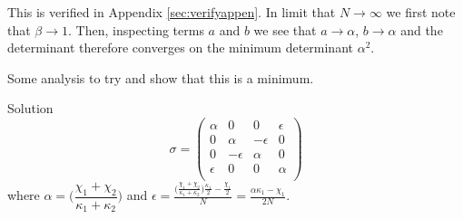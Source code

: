\documentclass[11pt,a4paper]{article}
\numberwithin{equation}{section}
\begin{document}
	This is verified in Appendix \ref{sec:verifyappen}. In limit that $N \rightarrow \infty$ we first note that $\beta \rightarrow 1$. Then, inspecting terms $a$ and $b$ we see that $a \rightarrow \alpha$, $b \rightarrow \alpha$ and the determinant therefore converges on the minimum determinant $\alpha^2$.
	
	Some analysis to try and show that this is a minimum.
	
	\iffalse

	Solution
	\begin{equation*}
	\sigma = \begin{pmatrix}
	\alpha & 0 & 0 & \epsilon\\
	0 & \alpha & -\epsilon & 0\\
	0 & -\epsilon & \alpha & 0 \\
	\epsilon & 0 & 0 & \alpha\\
	\end{pmatrix}
	\end{equation*}	
	where $\alpha = \Big(\dfrac{\chi_1 + \chi_2}{\kappa_1 + \kappa_2}\Big)$ and $\epsilon = \frac{\big(\frac{\chi_1 + \chi_2}{\kappa_1 + \kappa_2}\big) \frac{\kappa_1}{2} - \frac{\chi_1}{2}}{N} = \frac{\alpha \kappa_1 - \chi_1}{2N}$.
	
\end{document}
